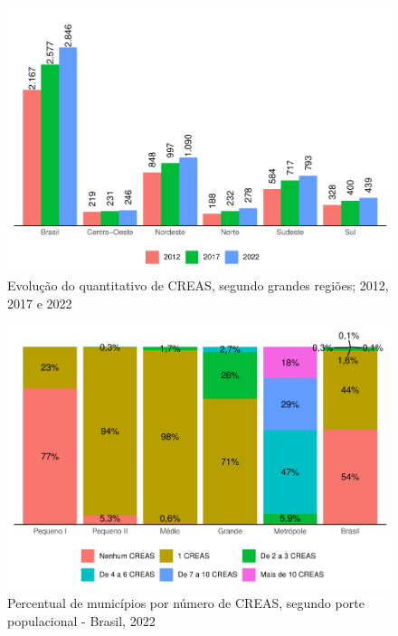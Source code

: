 \documentclass[
  brazilian]{report}
\begin{document}
\begin{figure}
\includegraphics{Censo-SUAS-2022_files/figure-latex/creas-quantitativo-1} \caption[Evolução do quantitativo de CREAS, segundo grandes regiões]{Evolução do quantitativo de CREAS, segundo grandes regiões; 2012, 2017 e 2022}\label{fig:creas-quantitativo}
\end{figure}

\begin{figure}
\includegraphics{Censo-SUAS-2022_files/figure-latex/CREAS-porte-1} \caption[Percentual de municípios por número de CREAS, segundo porte populacional - Brasil, 2022]{Percentual de municípios por número de CREAS, segundo porte populacional - Brasil, 2022}\label{fig:CREAS-porte}
\end{figure}
\end{document}
